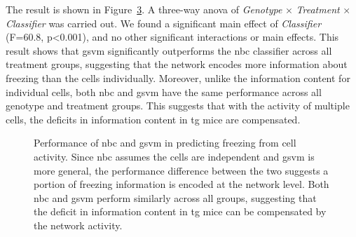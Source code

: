 The result is shown in Figure~\ref{f.ad.classifier}. A three-way \gls{anova} of \textit{Genotype} $\times$ \textit{Treatment} $\times$ \textit{Classifier} was carried out. We found a significant main effect of \textit{Classifier} (F=60.8, p<0.001), and no other significant interactions or main effects. This result shows that \gls{gsvm} significantly outperforms the \gls{nbc} classifier across all treatment groups, suggesting that the network encodes more information about freezing than the cells individually. Moreover, unlike the information content for individual cells, both \gls{nbc} and \gls{gsvm} have the same performance across all genotype and treatment groups. This suggests that with the activity of multiple cells, the deficits in information content in \gls{tg} mice are compensated. 

\begin{figure}[h]
    \begin{subfigure}[b]{0.5\textwidth}
        
        \caption{\label{f.ad.nb}}
    \end{subfigure}
    \begin{subfigure}[b]{0.5\textwidth}
        
        \caption{\label{f.ad.svm}}
    \end{subfigure}
    \caption[Accuracy of machine learning classifiers in predicting freezing.]{Performance of  \gls{nbc} and  \gls{gsvm} in predicting freezing from cell activity. Since \gls{nbc} assumes the cells are independent and \gls{gsvm} is more general, the performance difference between the two suggests a portion of freezing information is encoded at the network level. Both \gls{nbc} and \gls{gsvm} perform similarly across all groups, suggesting that the deficit in information content in \gls{tg} mice can be compensated by the network activity. \label{f.ad.classifier}}
\end{figure}

